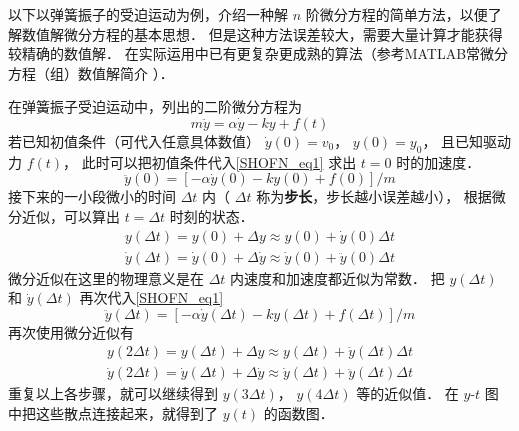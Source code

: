

以下以弹簧振子的受迫运动为例，介绍一种解 $n$ 阶微分方程的简单方法，以便了解数值解微分方程的基本思想． 但是这种方法误差较大，需要大量计算才能获得较精确的数值解． 在实际运用中已有更复杂更成熟的算法（参考MATLAB常微分方程（组）数值解简介%
）．

在弹簧振子受迫运动中，列出的二阶微分方程为
\begin{equation}\label{SHOFN_eq1}
m\ddot y = \alpha \dot y - ky + f(t)
\end{equation}
若已知初值条件（可代入任意具体数值） $\dot y(0) = v_0$，  $y(0) = y_0$， 且已知驱动力 $f(t)$， 此时可以把初值条件代入\autoref{SHOFN_eq1} 求出 $t = 0$ 时的加速度．
\begin{equation}
\ddot y(0) = [- \alpha \dot y(0) - ky(0) + f(0)]/m
\end{equation}
接下来的一小段微小的时间 $\Delta t$ 内（ $\Delta t$ 称为\textbf{步长}，步长越小误差越小）， 根据微分近似，可以算出 $t = \Delta t$ 时刻的状态．
\begin{gather}
y(\Delta t) =  y(0) + \Delta y \approx y(0) + \dot y(0) \Delta t\\
\dot y(\Delta t) = \dot y(0) + \Delta \dot y \approx \dot y(0) + \ddot y(0) \Delta t
\end{gather}
微分近似在这里的物理意义是在 $\Delta t$ 内速度和加速度都近似为常数． 把 $y(\Delta t)$ 和 $\dot y(\Delta t)$ 再次代入\autoref{SHOFN_eq1}
\begin{equation}
\ddot y(\Delta t) = [- \alpha \dot y(\Delta t) - ky(\Delta t) + f(\Delta t)]/m
\end{equation}
再次使用微分近似有
\begin{gather}
y(2\Delta t) =  y(\Delta t) + \Delta y \approx y(\Delta t) + \dot y(\Delta t) \Delta t\\
\dot y(2\Delta t) = \dot y(\Delta t) + \Delta \dot y \approx \dot y(\Delta t) + \ddot y(\Delta t) \Delta t
\end{gather}
重复以上各步骤，就可以继续得到 $y(3\Delta t)$，  $y(4\Delta t)$ 等的近似值． 在 $y$-$t$ 图中把这些散点连接起来，就得到了 $y(t)$ 的函数图．

